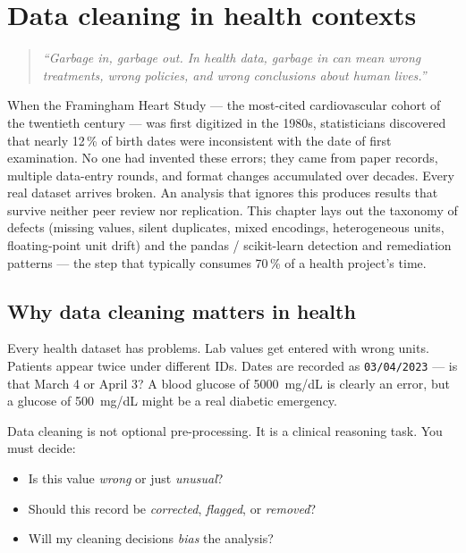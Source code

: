 \chapter{Data cleaning in health contexts}
\label{ch:data-cleaning}

\begin{quote}
\emph{``Garbage in, garbage out. In health data, garbage in can mean wrong treatments, wrong policies, and wrong conclusions about human lives.''}
\end{quote}

When the Framingham Heart Study --- the most-cited cardiovascular cohort of the twentieth century --- was first digitized in the 1980s, statisticians discovered that nearly 12\,\% of birth dates were inconsistent with the date of first examination. No one had invented these errors; they came from paper records, multiple data-entry rounds, and format changes accumulated over decades. Every real dataset arrives broken. An analysis that ignores this produces results that survive neither peer review nor replication. This chapter lays out the taxonomy of defects (missing values, silent duplicates, mixed encodings, heterogeneous units, floating-point unit drift) and the pandas / scikit-learn detection and remediation patterns --- the step that typically consumes 70\,\% of a health project's time.

\section{Why data cleaning matters in health}

Every health dataset has problems. Lab values get entered with wrong units. Patients appear twice under different IDs. Dates are recorded as \texttt{03/04/2023} --- is that March 4 or April 3? A blood glucose of 5000~mg/dL is clearly an error, but a glucose of 500~mg/dL might be a real diabetic emergency.

Data cleaning is not optional pre-processing. It is a clinical reasoning task. You must decide:
\begin{itemize}
  \item Is this value \emph{wrong} or just \emph{unusual}?
  \item Should this record be \emph{corrected}, \emph{flagged}, or \emph{removed}?
  \item Will my cleaning decisions \emph{bias} the analysis?
\end{itemize}

